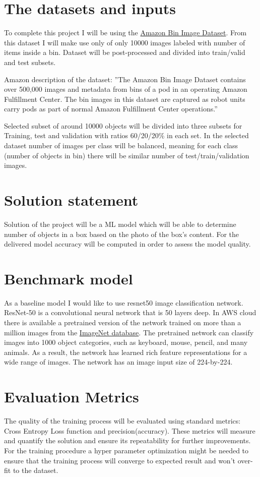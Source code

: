 \documentclass{article}
\begin{document}
\section{The datasets and inputs}
To complete this project I will be using the \href{https://registry.opendata.aws/amazon-bin-imagery/}{Amazon Bin Image Dataset}. From this dataset I will make use only of only 10000 images labeled with number of items inside a bin. Dataset will be post-processed and divided into train/valid and test subsets.

Amazon description of the dataset: ''The Amazon Bin Image Dataset contains over 500,000 images and metadata from bins of a pod in an operating Amazon Fulfillment Center. The bin images in this dataset are captured as robot units carry pods as part of normal Amazon Fulfillment Center operations.''

Selected subset of around 10000 objects will be divided into three subsets for Training, test and validation with ratios 60/20/20\% in each set. In the selected dataset number of images per class will be balanced, meaning for each class (number of objects in bin) there will be similar number of test/train/validation images.

\section{Solution statement}
Solution of the project will be a ML model which will be able to determine number of objects in a box based on the photo of the box's content. For the delivered model accuracy will be computed in order to assess the model quality.

\section{Benchmark model}
As a baseline model I would like to use resnet50 image classification network. ResNet-50 is a convolutional neural network that is 50 layers deep. In AWS cloud there is available a pretrained version of the network trained on more than a million images from the \href{http://www.image-net.org}{ImageNet database}. The pretrained network can classify images into 1000 object categories, such as keyboard, mouse, pencil, and many animals. As a result, the network has learned rich feature representations for a wide range of images. The network has an image input size of 224-by-224.

\section{Evaluation Metrics}
The quality of the training process will be evaluated using standard metrics: Cross Entropy Loss function and precision(accuracy). These metrics will measure and quantify the solution and ensure its repeatability for further improvements. For the training procedure a hyper parameter optimization might be needed to ensure that the training process will converge to expected result and won't over-fit to the dataset.
\end{document}
